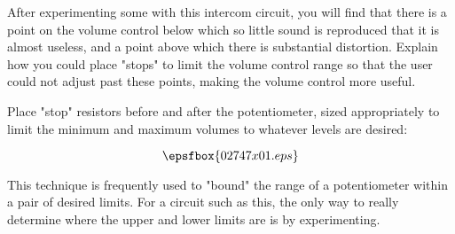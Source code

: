 

After experimenting some with this intercom circuit, you will find that there is a point on the volume control below which so little sound is reproduced that it is almost useless, and a point above which there is substantial distortion.  Explain how you could place "stops" to limit the volume control range so that the user could not adjust past these points, making the volume control more useful.







Place "stop" resistors before and after the potentiometer, sized appropriately to limit the minimum and maximum volumes to whatever levels are desired:

$$\epsfbox{02747x01.eps}$$







This technique is frequently used to "bound" the range of a potentiometer within a pair of desired limits.  For a circuit such as this, the only way to really determine where the upper and lower limits are is by experimenting.



